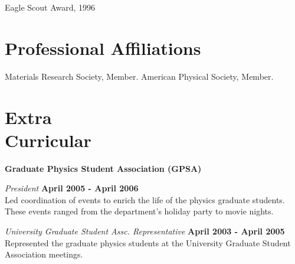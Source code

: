 \documentclass[letterpaper,margin,line]{res}
\begin{document}
\begin{resume}
\vspace*{-2.5mm}
Eagle Scout Award, 1996


\section{\sc Professional Affiliations} 
Materials Research Society, Member.
American Physical Society, Member.

\section{\sc Extra\\ Curricular}
{\bf Graduate Physics Student Association (GPSA)}

\vspace{-.3cm}
{\em President} \hfill {\bf April 2005 - April 2006} \\
Led coordination of events to enrich the life of the physics graduate students. These events ranged from the department's holiday party to movie nights.

\vspace{-.3cm}
{\em University Graduate Student Assc. Representative} \hfill {\bf April 2003 - April 2005}\\
Represented the graduate physics students at the University Graduate Student Association meetings.






% 



\end{resume}
\end{document}
